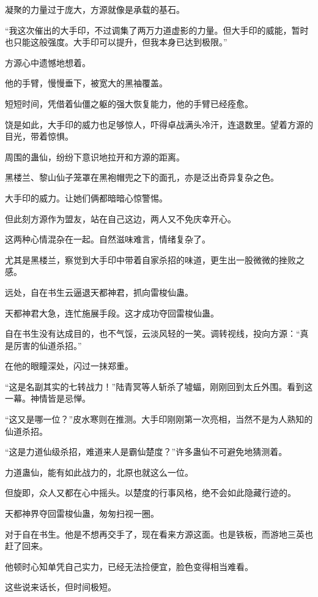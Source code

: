 \begin{this_body}
凝聚的力量过于庞大，方源就像是承载的基石。

“我这次催出的大手印，不过调集了两万力道虚影的力量。但大手印的威能，暂时也只能这般强度。大手印可以提升，但我本身已达到极限。”

方源心中遗憾地想着。

他的手臂，慢慢垂下，被宽大的黑袖覆盖。

短短时间，凭借着仙僵之躯的强大恢复能力，他的手臂已经痊愈。

饶是如此，大手印的威力也足够惊人，吓得卓战满头冷汗，连退数里。望着方源的目光，带着惊惧。

周围的蛊仙，纷纷下意识地拉开和方源的距离。

黑楼兰、黎山仙子笼罩在黑袍帽兜之下的面孔，亦是泛出奇异复杂之色。

大手印的威力。让她们俩都暗暗心惊警惕。

但此刻方源作为盟友，站在自己这边，两人又不免庆幸开心。

这两种心情混杂在一起。自然滋味难言，情绪复杂了。

尤其是黑楼兰，察觉到大手印中带着自家杀招的味道，更生出一股微微的挫败之感。

远处，自在书生云逼退天都神君，抓向雷梭仙蛊。

天都神君大急，连忙施展手段。这才成功夺回雷梭仙蛊。

自在书生没有达成目的，也不气馁，云淡风轻的一笑。调转视线，投向方源：“真是厉害的仙道杀招。”

在他的眼瞳深处，闪过一抹郑重。

“这是名副其实的七转战力！”陆青冥等人斩杀了墟蝠，刚刚回到太丘外围。看到这一幕。神情皆是忌惮。

“这又是哪一位？”皮水寒则在推测。大手印刚刚第一次亮相，当然不是为人熟知的仙道杀招。

“这是力道仙级杀招，难道来人是霸仙楚度？”许多蛊仙不可避免地猜测着。

力道蛊仙，能有如此战力的，北原也就这么一位。

但旋即，众人又都在心中摇头。以楚度的行事风格，绝不会如此隐藏行迹的。

天都神界夺回雷梭仙蛊，匆匆扫视一圈。

对于自在书生。他是不想再交手了，现在看来方源这面。也是铁板，而游地三英也赶了回来。

他顿时心知单凭自己实力，已经无法捡便宜，脸色变得相当难看。

这些说来话长，但时间极短。


\end{this_body}
